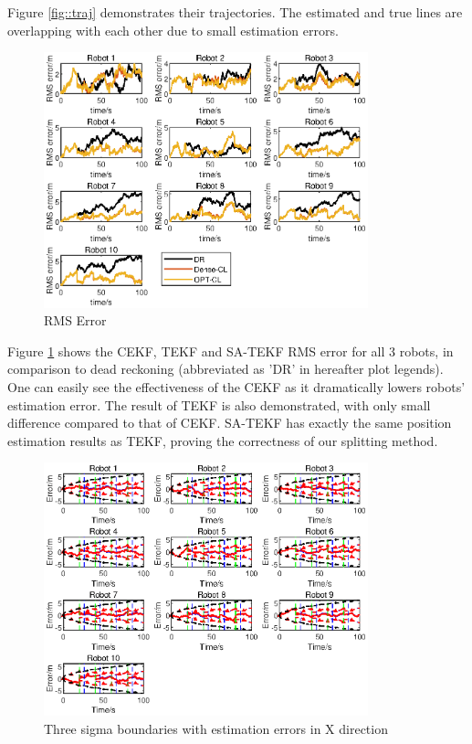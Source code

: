 \documentclass[conference]{IEEEtran}
\begin{document}
Figure \ref{fig::traj} demonstrates their trajectories. The estimated and true lines are overlapping with each other due to small estimation errors.
\begin{figure}
	\centering
	\includegraphics[width=3.7in]{Fig/fig2_rmse.eps}
	\caption{RMS Error}
	\label{fig::rmse}
\end{figure}
Figure \ref{fig::rmse} shows the CEKF, TEKF and SA-TEKF RMS error for all 3 robots, in comparison to dead reckoning (abbreviated as 'DR' in hereafter plot legends).
One can easily see the effectiveness of the CEKF as it dramatically lowers robots' estimation error.
The result of TEKF is also demonstrated, with only small difference compared to that of CEKF.
SA-TEKF has exactly the same position estimation results as TEKF, proving the correctness of our splitting method.
\begin{figure}
	\centering
	\includegraphics[width=3.7in]{Fig/fig3_3sigma.eps}
	\caption{Three sigma boundaries with estimation errors in X direction}
	\label{fig::3sigma}
\end{figure}
\end{document}

